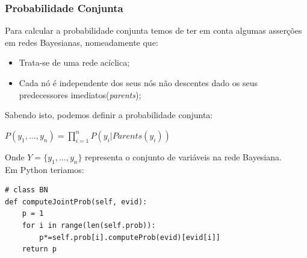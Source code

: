\documentclass[11pt, a4paper, twocolumn]{article}
\begin{document}
\subsubsection{Probabilidade Conjunta}
\hspace{10mm}Para calcular a probabilidade conjunta temos de ter em conta algumas asserções em redes Bayesianas, nomeadamente que:
\begin{itemize}
\item Trata-se de uma rede acíclica; 
\item Cada nó é independente dos seus nós não descentes dado os seus predecessores imediatos(\textit{parents});
\end{itemize}
Sabendo isto, podemos definir a probabilidade conjunta:
\begin{center}
$P(y_{1},...,y_{n}) = \displaystyle\prod_{i=1}^{n}P(y_{i}|Parents(y_{i}))$ 
\end{center}
Onde $Y = \{y_{1},..., y_{n}\}$ representa o conjunto de variáveis na rede Bayesiana.\\
Em Python teriamos:
\begin{lstlisting}
# class BN
def computeJointProb(self, evid):
	p = 1
	for i in range(len(self.prob)):
		p*=self.prob[i].computeProb(evid)[evid[i]]
	return p
\end{lstlisting}
\end{document}
